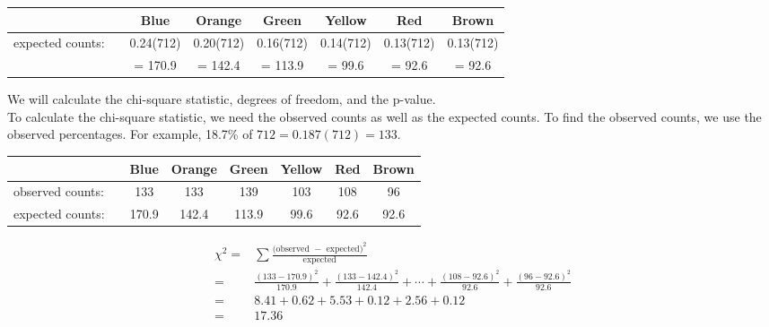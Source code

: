 \begin{examplewrap}
\begin{nexample}
\begin{description}
\begin{small}
\begin{tabular}{ll ccc ccc}
\hline
	 & \hspace{1mm} & Blue & Orange & Green & Yellow & Red & Brown\\
\hline
expected counts:&		& 0.24(712) &  0.20(712) & 0.16(712) & 0.14(712) & 0.13(712) & 0.13(712)  \\
&		& = 170.9 &  = 142.4 & = 113.9 & = 99.6 & = 92.6 & = 92.6\\ 
\hline
\end{tabular}
\end{small}

\item[ \inferencestep{Calculate} ]  We will calculate the chi-square statistic, degrees of freedom, and the p-value.\\
To calculate the chi-square statistic, we need the observed counts as well as the expected counts.  To find the observed counts, we use the observed percentages.  For example, 18.7\% of $712 = 0.187(712)=133$.

\begin{center}
\begin{small}
\begin{tabular}{ll ccc ccc}
\hline
	 & \hspace{1mm} & Blue & Orange & Green & Yellow & Red & Brown\\
\hline
observed counts:&		& 133 & 133 & 139 & 103 & 108 & 96  \\
expected counts:&		& 170.9 &  142.4 & 113.9 & 99.6 & 92.6 & 92.6\\
\hline
\end{tabular}
\end{small}
\end{center}
\begin{small}
\begin{align*}
\chi^2
  =& \sum{\frac{\text{(observed } - \text{ expected})^2}
      {\text{expected}}}\\
  =& \frac{(133 - 170.9)^2}{170.9}
      + \frac{(133 - 142.4)^2}{142.4}
      + \cdots
      + \frac{(108 - 92.6)^2}{92.6}
      + \frac{(96 - 92.6)^2}{92.6}\\
=&8.41+0.62+5.53+0.12+2.56+0.12\\
=&17.36
\end{align*}
\end{small}


\end{description}
\end{nexample}
\end{examplewrap}
